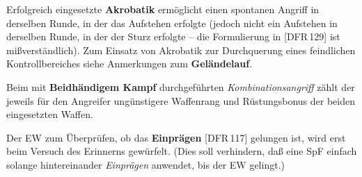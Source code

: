 \documentclass[10pt,a4paper,germanpar]{article}
\begin{document}
Erfolgreich eingesetzte \textbf{Akrobatik} ermöglicht einen spontanen
Angriff in derselben Runde, in der das Aufstehen erfolgte (jedoch
nicht ein Aufstehen in derselben Runde, in der der Sturz erfolgte --
die Formulierung in [DFR\,129] ist mißverständlich). Zum Einsatz von
Akrobatik zur Durchquerung eines feindlichen Kontrollbereiches siehe
Anmerkungen zum \textbf{Geländelauf}.

Beim mit \textbf{Beidhändigem Kampf} durchgeführten
\emph{Kombinationsangriff} zählt der jeweils für den Angreifer
ungünstigere Waffenrang und Rüstungsbonus der beiden eingesetzten
Waffen.

Der EW zum Überprüfen, ob das \textbf{Einprägen} [DFR\,117] gelungen
ist, wird erst beim Versuch des Erinnerns gewürfelt. (Dies soll
verhindern, daß eine SpF einfach solange hintereinander
\emph{Einprägen} anwendet, bis der EW gelingt.)
\end{document}
